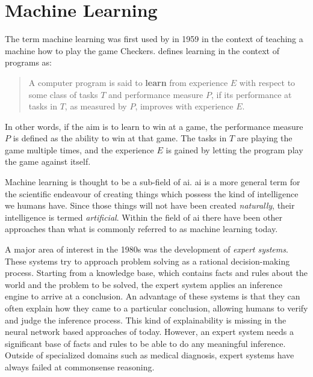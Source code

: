\documentclass[draft,final]{vutinfth} %
\begin{document}
\section{Machine Learning}
\label{sec:theory-ml}

The term machine learning was first used by \textcite{samuel1959} in
1959 in the context of teaching a machine how to play the game
Checkers. \textcite{mitchell1997a} defines learning in the context of
programs as:
\begin{quote}
  A computer program is said to \textbf{learn} from experience $E$
  with respect to some class of tasks $T$ and performance measure $P$,
  if its performance at tasks in $T$, as measured by $P$, improves
  with experience $E$. \cite[p.2]{mitchell1997a}
\end{quote}
In other words, if the aim is to learn to win at a game, the
performance measure $P$ is defined as the ability to win at that
game. The tasks in $T$ are playing the game multiple times, and the
experience $E$ is gained by letting the program play the game against
itself.

Machine learning is thought to be a sub-field of \gls{ai}. \gls{ai} is
a more general term for the scientific endeavour of creating things
which possess the kind of intelligence we humans have. Since those
things will not have been created \emph{naturally}, their intelligence
is termed \emph{artificial}. Within the field of \gls{ai} there have
been other approaches than what is commonly referred to as machine
learning today.

A major area of interest in the 1980s was the development of
\emph{expert systems}. These systems try to approach problem solving
as a rational decision-making process. Starting from a knowledge base,
which contains facts and rules about the world and the problem to be
solved, the expert system applies an inference engine to arrive at a
conclusion. An advantage of these systems is that they can often
explain how they came to a particular conclusion, allowing humans to
verify and judge the inference process. This kind of explainability is
missing in the neural network based approaches of today. However, an
expert system needs a significant base of facts and rules to be able
to do any meaningful inference. Outside of specialized domains such as
medical diagnosis, expert systems have always failed at commonsense
reasoning.
\end{document}

